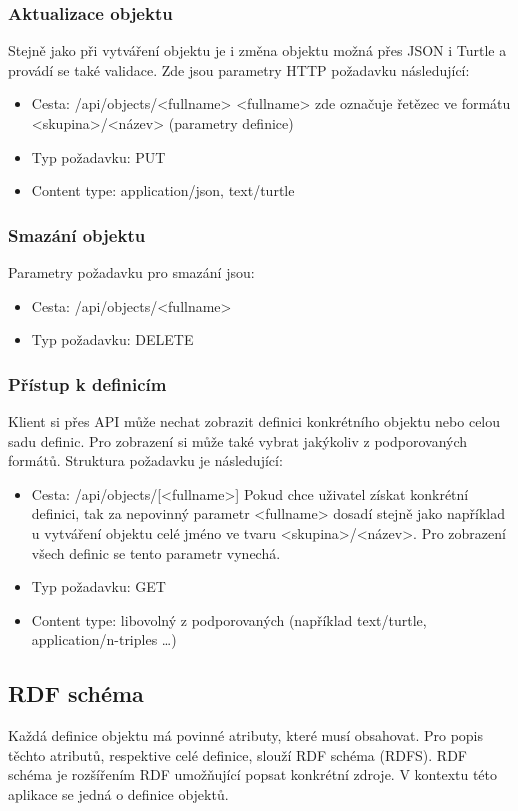 \documentclass[thesis=B,czech]{FITthesis}[2012/06/26]
\begin{document}
  \subsubsection{Aktualizace objektu}
  Stejně jako při vytváření objektu je i změna objektu možná přes JSON i Turtle a provádí se také validace.
  Zde jsou parametry HTTP požadavku následující:
  \begin{itemize}
   \item Cesta: /api/objects/<fullname>
    \subitem <fullname> zde označuje řetězec ve formátu <skupina>/<název> (parametry definice)
   \item Typ požadavku: PUT
   \item Content type: application/json, text/turtle
  \end{itemize}

  \subsubsection{Smazání objektu}
  Parametry požadavku pro smazání jsou:
  \begin{itemize}
   \item Cesta: /api/objects/<fullname>
   \item Typ požadavku: DELETE
  \end{itemize}
  
  \subsubsection{Přístup k definicím}
  Klient si přes API může nechat zobrazit definici konkrétního objektu nebo celou sadu definic. Pro zobrazení si může také
  vybrat jakýkoliv z podporovaných formátů.
  Struktura požadavku je následující:
  \begin{itemize}
   \item Cesta: /api/objects/[<fullname>]
    \subitem Pokud chce uživatel získat konkrétní definici, tak za nepovinný parametr <fullname> dosadí stejně jako například u vytváření objektu
    celé jméno ve tvaru <skupina>/<název>. Pro zobrazení všech definic se tento parametr vynechá.
   \item Typ požadavku: GET
   \item Content type: libovolný z podporovaných (například text/turtle, application/n-triples \ldots)
  \end{itemize}
  
  \subsection{RDF schéma}
  Každá definice objektu má povinné atributy, které musí obsahovat. Pro popis těchto atributů, respektive celé definice, slouží RDF schéma (RDFS).
  RDF schéma je rozšířením RDF umožňující popsat konkrétní zdroje. V kontextu této aplikace se jedná o definice objektů.
  
\end{document}
